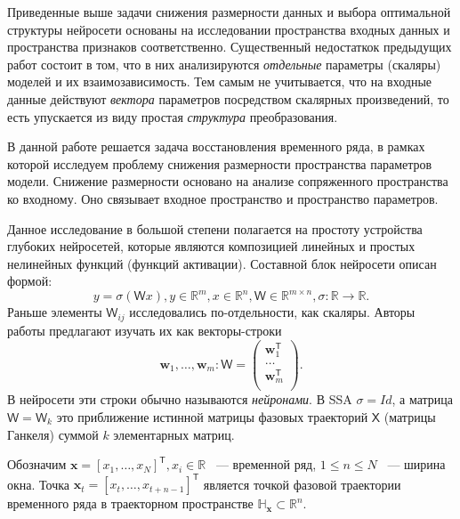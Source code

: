 \documentclass[12pt, twoside]{article}
\begin{document}
Приведенные выше задачи снижения размерности данных и выбора оптимальной структуры нейросети основаны на исследовании пространства входных данных и пространства признаков соответственно. Существенный недостаткок предыдущих работ состоит в том, что в них анализируются \textit{отдельные} параметры (скаляры) моделей и их взаимозависимость. Тем самым не учитывается, что на входные данные действуют \textit{вектора} параметров посредством скалярных произведений, то есть упускается из виду простая \textit{структура} преобразования.

В данной работе решается задача восстановления временного ряда, в рамках которой исследуем проблему снижения размерности пространства параметров модели. Снижение размерности основано на анализе сопряженного пространства ко входному. Оно связывает входное пространство и пространство параметров. 



Данное исследование в большой степени полагается на простоту устройства глубоких нейросетей, которые являются композицией линейных и простых нелинейных функций (функций активации). Составной блок нейросети описан формой:  \[y=\sigma(\mathsf{W}x), y \in \mathbb{R}^m, x \in \mathbb{R}^n, \mathsf{W} \in \mathbb{R}^{m \times n}, \sigma: \mathbb{R} \to \mathbb{R}.\] Раньше элементы $\mathsf{W}_{ij}$ исследовались по-отдельности, как скаляры. Авторы работы предлагают изучать их как векторы-строки \[\mathbf{w}_1, \dots, \mathbf{w}_m: \mathsf{W} = \begin{pmatrix}
\mathbf{w}_1^{\mathsf{T}}\\
\dots\\
\mathbf{w}_m^{\mathsf{T}}\\
\end{pmatrix}.\] В нейросети эти строки обычно называются \textit{нейронами}. В SSA $\sigma = Id$, а матрица $\mathsf{W}=\mathsf{W}_k$ это приближение истинной матрицы фазовых траекторий $\mathsf{X}$ (матрицы Ганкеля) суммой $k$ элементарных матриц.


Обозначим $\mathbf{x} = [x_1, \dots, x_N]^{\mathsf{T}}, x_i \in \mathbb{R}$ ~--- временной ряд, $1 \le n \le N$ ~--- ширина окна. Точка $\mathbf{x}_t = [x_t, \dots, x_{t + n - 1}]^{\mathsf{T}}$ является точкой фазовой траектории временного ряда в траекторном пространстве $\mathbb{H}_{\mathbf{x}} \subset \mathbb{R}^n$. 
\end{document}
